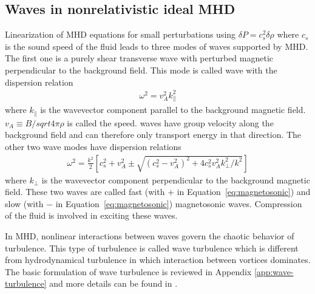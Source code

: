 \subsection{Waves in nonrelativistic ideal MHD}
Linearization of MHD equations for small perturbations using $\delta P = c_s^2\delta \rho$ where $c_s$ is the sound speed of the fluid leads to three modes of waves supported by MHD.
The first one is a purely shear transverse wave with perturbed magnetic perpendicular to the background field.
This mode is called \alfven wave with the dispersion relation 
\begin{eqnarray}
	\omega^2 = v_A^2 k_{\parallel}^2
\end{eqnarray}
where $k_{\parallel}$ is the wavevector component parallel to the background magnetic field.
$v_A\equiv B/sqrt{4\pi\rho}$ is called the \alfven speed.
\alfven waves have group velocity along the background field and can therefore only transport energy in that direction.
The other two wave modes have dispersion relations
\begin{eqnarray}\label{eq:magnetosonic}
	\omega^2 = \frac{k^2}{2}\left[ c_s^2 + v_A^2 \pm\sqrt{(c_s^2-v_A^2)^2+4 c_s^2 v_A^2k_\perp^2/k^2}  \right]
\end{eqnarray}
where $k_\perp$ is the wavevector component perpendicular to the background magnetic field.
These two waves are called fast (with $+$ in Equation~\ref{eq:magnetosonic}) and slow (with $-$ in Equation~\ref{eq:magnetosonic}) magnetosonic waves. Compression of the fluid is involved in exciting these waves.

In MHD, nonlinear interactions between waves govern the chaotic behavior of turbulence.
This type of turbulence is called wave turbulence which is different from hydrodynamical turbulence in which interaction between vortices dominates.
The basic formulation of wave turbulence is reviewed in Appendix \ref{app:wave-turbulence} and more details can be found in \citet{2011LNP...825.....N}.

